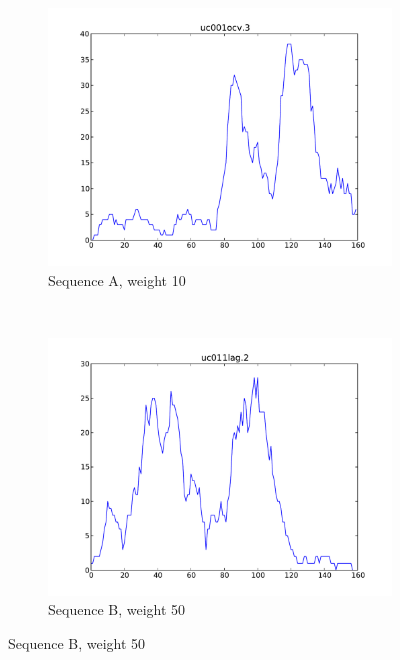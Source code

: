 \documentclass[parskip]{cs4rep}
\begin{document}
\begin{figure}
    \centering
    \begin{subfigure}[b]{0.45\textwidth}
        \centering
        \includegraphics[width=\textwidth]{figures/clustering/prototypes/uc001ocv_3.pdf}
        \caption{Sequence A, weight 10}
        \label{fig:clustering:prototypes:seq_a} 
    \end{subfigure}
    ~
    \begin{subfigure}[b]{0.45\textwidth}
        \centering
        \includegraphics[width=\textwidth]{figures/clustering/prototypes/uc011lag_2.pdf}
        \caption{Sequence B, weight 50}
        \label{fig:clustering:prototypes:seq_b} 
    \end{subfigure}

\end{figure}
\end{document}
